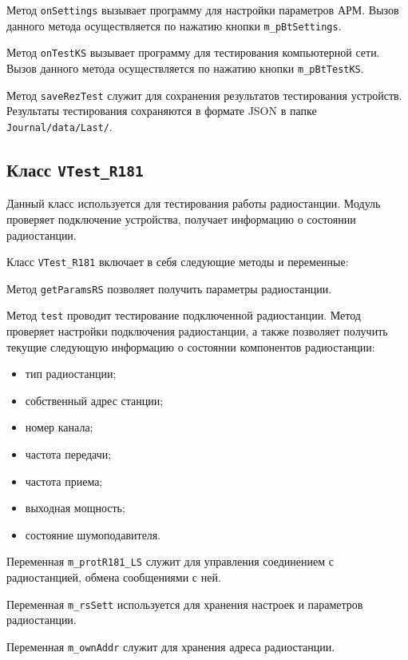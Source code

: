 \begin{enum}
	\item Метод \texttt{onSettings} вызывает программу для настройки параметров АРМ.
		Вызов данного метода осуществляется по нажатию кнопки\break
		\texttt{m\_pBtSettings}.

	\item Метод \texttt{onTestKS} вызывает программу для тестирования компьютерной сети.
		Вызов данного метода осуществляется по нажатию кнопки\break
		\texttt{m\_pBtTestKS}.

	\item Метод \texttt{saveRezTest} служит для сохранения результатов тестирования устройств. Результаты
		тестирования сохраняются в формате JSON в папке \texttt{Journal/data/Last/}.
\end{enum}

\subsection{Класс \texttt{VTest\_R181}}
Данный класс используется для тестирования работы радиостанции. Модуль проверяет подключение устройства, получает
информацию о состоянии радиостанции.

Класс \texttt{VTest\_R181} включает в себя следующие методы и переменные:
\begin{enum}
	\item Метод \texttt{getParamsRS} позволяет получить параметры радиостанции.

	\item Метод \texttt{test} проводит тестирование подключенной радиостанции. Метод проверяет настройки подключения
		радиостанции, а также позволяет получить текущие следующую информацию о состоянии компонентов
		радиостанции:
		\begin{itemize}
			\item тип радиостанции;
			\item собственный адрес станции;
			\item номер канала;
			\item частота передачи;
			\item частота приема;
			\item выходная мощность;
			\item состояние шумоподавителя.
		\end{itemize}

	\item Переменная \texttt{m\_protR181\_LS} служит для управления соединением с радиостанцией, обмена сообщениями
		с ней.

	\item Переменная \texttt{m\_rsSett} используется для хранения настроек и параметров радиостанции.

	\item Переменная \texttt{m\_ownAddr} служит для хранения адреса радиостанции.
\end{enum}


